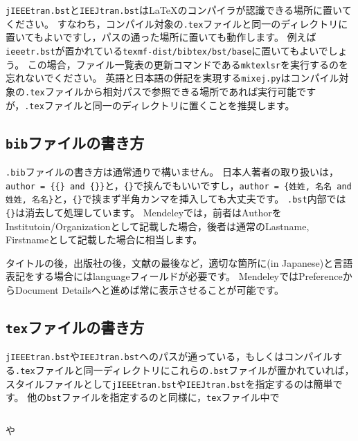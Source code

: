 \documentclass[10pt, a4paper, dvipdfmx, uplatex]{jsarticle} %
\begin{document}
\texttt{jIEEEtran.bst}と\texttt{IEEJtran.bst}は\LaTeX のコンパイラが認識できる場所に置いてください。
すなわち，コンパイル対象の\texttt{.tex}ファイルと同一のディレクトリに置いてもよいですし，パスの通った場所に置いても動作します。
例えば\texttt{ieeetr.bst}が置かれている\texttt{texmf-dist/bibtex/bst/base}に置いてもよいでしょう。
この場合，ファイル一覧表の更新コマンドである\texttt{mktexlsr}を実行するのを忘れないでください。
英語と日本語の併記を実現する\texttt{mixej.py}はコンパイル対象の\texttt{.tex}ファイルから相対パスで参照できる場所であれば実行可能ですが，\texttt{.tex}ファイルと同一のディレクトリに置くことを推奨します。



\subsection{\texttt{bib}ファイルの書き方}

\texttt{.bib}ファイルの書き方は通常通りで構いません。
日本人著者の取り扱いは，\texttt{author = \{\{}\texttt{\} and \{}\texttt{\}\}}と，\texttt{\{\}}で挟んでもいいですし，\texttt{author = \{姓姓, 名名 and 姓姓, 名名\}}と，\texttt{\{\}}で挟まず半角カンマを挿入しても大丈夫です。
\texttt{.bst}内部では\texttt{\{\}}は消去して処理しています。
Mendeleyでは，前者はAuthorをInstitutoin/Organizationとして記載した場合，後者は通常のLastname, Firstnameとして記載した場合に相当します。

タイトルの後，出版社の後，文献の最後など，適切な箇所に(in Japanese)と言語表記をする場合にはlanguageフィールドが必要です。
MendeleyではPreferenceからDocument Detailsへと進めば常に表示させることが可能です。



\subsection{\texttt{tex}ファイルの書き方}

\texttt{jIEEEtran.bst}や\texttt{IEEJtran.bst}へのパスが通っている，もしくはコンパイルする\texttt{.tex}ファイルと同一ディレクトリにこれらの\texttt{.bst}ファイルが置かれていれば，\BibTeX スタイルファイルとして\texttt{jIEEEtran.bst}や\texttt{IEEJtran.bst}を指定するのは簡単です。
他の\texttt{bst}ファイルを指定するのと同様に，\texttt{tex}ファイル中で

\noindent\makebox[\linewidth]{\rule{\linewidth}{0.4pt}}\vspace{-0.5zw}
\begin{lstlisting}[style=onecol]

\end{lstlisting}\vspace{-1.8zw}
\noindent\makebox[\linewidth]{\rule{\linewidth}{0.4pt}}\vspace{0.5zw}\par
\noindent
や
\end{document}
